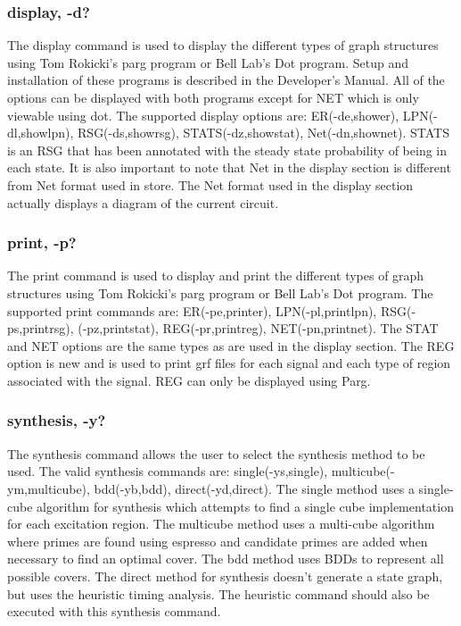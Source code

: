 \documentclass[titlepage,11pt]{article}
\begin{document}
  \subsubsection{display, -d?}
  The display command is used to display the different types of graph
  structures using Tom Rokicki's parg program or Bell Lab's Dot
  program.  Setup and installation of these programs is described in
  the Developer's Manual.  All of the options can be displayed with
  both programs except for NET which is only viewable using dot.  The
  supported display options are: ER(-de,shower), LPN(-dl,showlpn),
  RSG(-ds,showrsg), STATS(-dz,showstat), Net(-dn,shownet).  STATS is
  an RSG that has been annotated with the steady state probability of
  being in each state.  It is also important to note that Net in the
  display section is different from Net format used in store.  The Net
  format used in the display section actually displays a diagram of
  the current circuit.
  
  \subsubsection{print, -p?}
  The print command is used to display and print the different types
  of graph structures using Tom Rokicki's parg program or Bell Lab's Dot
  program.  The supported print commands are: ER(-pe,printer),
  LPN(-pl,printlpn), RSG(-ps,printrsg), (-pz,printstat),
  REG(-pr,printreg), NET(-pn,printnet).  The STAT and NET options are
  the same types as are used in the display section.  The REG option
  is new and is used to print grf files for each signal and each type
  of region associated with the signal.  REG can only be displayed
  using Parg.
  
  \subsubsection{synthesis, -y?}
  The synthesis command allows the user to select the synthesis method
  to be used.  The valid synthesis commands are: single(-ys,single),
  multicube(-ym,multicube), bdd(-yb,bdd), direct(-yd,direct).  The
  single method uses a single-cube algorithm for synthesis which
  attempts to find a single cube implementation for each excitation
  region.  The multicube method uses a multi-cube algorithm where
  primes are found using espresso and candidate primes are added when
  necessary to find an optimal cover.  The bdd method uses BDDs to
  represent all possible covers.  The direct method for synthesis
  doesn't generate a state graph, but uses the heuristic timing
  analysis.  The heuristic command should also be executed with this
  synthesis command.
  
\end{document}
